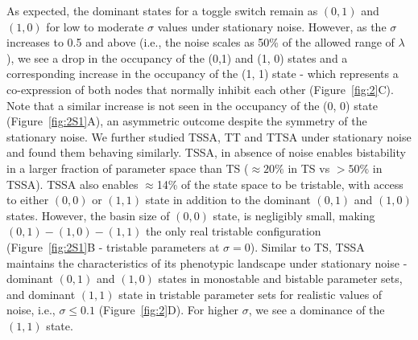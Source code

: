 \documentclass[11pt]{article}
\providecommand{\DIFaddtex}[1]{{\protect\color{red}#1}} %
\providecommand{\DIFdeltex}[1]{} %
\providecommand{\DIFaddbegin}{} %
\providecommand{\DIFaddend}{} %
\providecommand{\DIFdelbegin}{} %
\providecommand{\DIFdelend}{} %
\providecommand{\DIFadd}[1]{\texorpdfstring{\DIFaddtex{#1}}{#1}} %
\providecommand{\DIFdel}[1]{\texorpdfstring{\DIFdeltex{#1}}{}} %
\providecommand{\DIFaddincludegraphics}[2][]{\DIFOincludegraphics[#1]{#2}} %
\providecommand{\DIFdelincludegraphics}[2][]{}
\DeclareRobustCommand{\DIFaddbegin}{\DIFOaddbegin \let\includegraphics\DIFaddincludegraphics} %
\DeclareRobustCommand{\DIFaddend}{\DIFOaddend \let\includegraphics\DIFOincludegraphics} %
\DeclareRobustCommand{\DIFdelbegin}{\DIFOdelbegin \let\includegraphics\DIFdelincludegraphics} %
\DeclareRobustCommand{\DIFdelend}{\DIFOaddend \let\includegraphics\DIFOincludegraphics} %
\begin{document}
As expected, the dominant states for a toggle switch remain as $(0, 1)$ and $(1, 0)$ for low to moderate $\sigma$ values under stationary noise. However, as the $\sigma$ increases to 0.5 and above (i.e., the noise scales as 50\% of the allowed range of $\lambda$), we see a drop in the \DIFdelbegin \DIFdel{MRT }\DIFdelend \DIFaddbegin \DIFadd{occupancy }\DIFaddend of the (0,1) and (1, 0) states and a corresponding increase in the \DIFdelbegin \DIFdel{MRT }\DIFdelend \DIFaddbegin \DIFadd{occupancy }\DIFaddend of the (1, 1) state - which represents a co-expression of both nodes that normally inhibit each other (Figure~\ref{fig:2}C). Note that a similar increase is not seen in the \DIFdelbegin \DIFdel{MRT }\DIFdelend \DIFaddbegin \DIFadd{occupancy }\DIFaddend of the (0, 0) state (Figure~\ref{fig:2S1}A), an asymmetric outcome despite the symmetry of the stationary noise. We further studied TSSA, TT and TTSA under stationary noise and found them behaving similarly. TSSA, in absence of noise enables bistability in a larger fraction of parameter space than TS ($\approx 20\%$ in TS vs $>50\%$ in TSSA). TSSA also enables $\approx$14\% of the state space to be tristable, with access to either $(0, 0)$ or $(1, 1)$ state in addition to the dominant $(0, 1)$ and $(1, 0)$ states. However, the basin size of $(0, 0)$ state, is negligibly small, making $(0, 1) - (1, 0)-(1, 1)$ the only real tristable configuration (Figure~\ref{fig:2S1}B - tristable parameters at $\sigma = 0$). Similar to TS, TSSA maintains the characteristics of its phenotypic landscape under stationary noise - dominant $(0,1)$ and $(1,0)$ states in monostable and bistable parameter sets, and dominant $(1, 1)$ state in tristable parameter sets for realistic values of noise, i.e., $\sigma \leq 0.1$ (Figure~\ref{fig:2}D). For higher $\sigma$, we see a dominance of the $(1, 1)$ state. 
\end{document}
